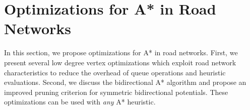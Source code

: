 \documentclass[manuscript,review]{acmart}
\begin{document}


\section{Optimizations for A* in Road Networks}\label{sec:astar_opts}

In this section, we propose optimizations for A* in road networks.
First, we present several low degree vertex optimizations which exploit road network characteristics to reduce the overhead of queue operations and heuristic evaluations.
Second, we discuss the bidirectional A* algorithm and propose an improved pruning criterion for symmetric bidirectional potentials.
These optimizations can be used with \emph{any} A* heuristic.
\end{document}
